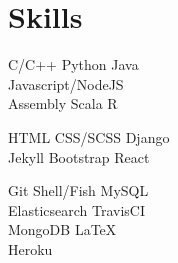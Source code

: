 \documentclass[a4paper]{deedy-resume} %
\begin{document}
\begin{minipage}[t]{0.30\textwidth}
  \section{Skills}

  \runsubsection{}
  C/C++ \textbullet{} Python \textbullet{} Java \\
  \textbullet{} Javascript/NodeJS \\
  \textbullet{} Assembly \textbullet{} Scala \textbullet{} R

  \sectionspace
  \sectionspace

  HTML \textbullet{} CSS/SCSS \textbullet{} Django \\
  \textbullet{} Jekyll \textbullet{} Bootstrap \textbullet{} React

  \sectionspace
  \sectionspace

  Git \textbullet{} Shell/Fish \textbullet{} MySQL\\
  \textbullet{} Elasticsearch \textbullet{} TravisCI \\
  \textbullet{} MongoDB \textbullet{} \LaTeX\\
  \textbullet{} Heroku
  
\end{minipage}
\hfill
\end{document}

